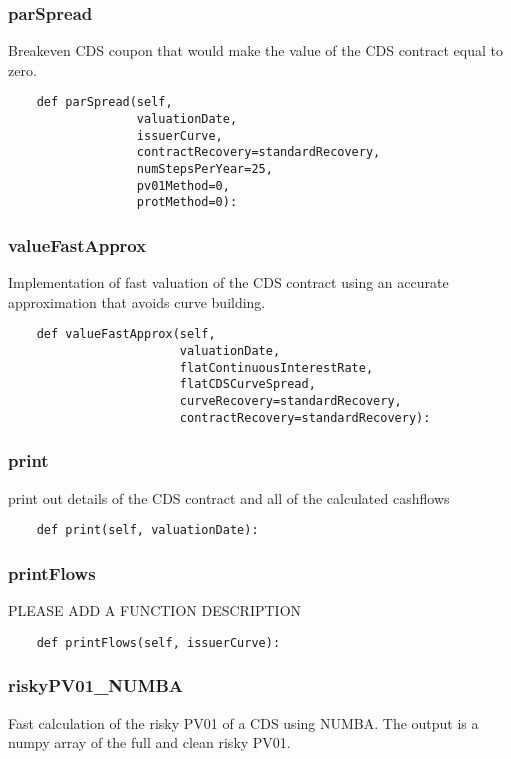 \documentclass[twoside,11pt]{book}
\begin{document}
\subsubsection*{{\bf parSpread}}
Breakeven CDS coupon that would make the value of the CDS contract equal to zero.  

\begin{lstlisting}
    def parSpread(self,
                  valuationDate,
                  issuerCurve,
                  contractRecovery=standardRecovery,
                  numStepsPerYear=25,
                  pv01Method=0,
                  protMethod=0):
\end{lstlisting}

\subsubsection*{{\bf valueFastApprox}}
Implementation of fast valuation of the CDS contract using an accurate approximation that avoids curve building.  

\begin{lstlisting}
    def valueFastApprox(self,
                        valuationDate,
                        flatContinuousInterestRate,
                        flatCDSCurveSpread,
                        curveRecovery=standardRecovery,
                        contractRecovery=standardRecovery):
\end{lstlisting}

\subsubsection*{{\bf print}}
print out details of the CDS contract and all of the calculated cashflows  

\begin{lstlisting}
    def print(self, valuationDate):
\end{lstlisting}

\subsubsection*{{\bf printFlows}}
PLEASE ADD A FUNCTION DESCRIPTION

\begin{lstlisting}
    def printFlows(self, issuerCurve):
\end{lstlisting}

\subsubsection*{{\bf riskyPV01\_NUMBA}}
Fast calculation of the risky PV01 of a CDS using NUMBA. The output is a numpy array of the full and clean risky PV01. 
\end{document}
